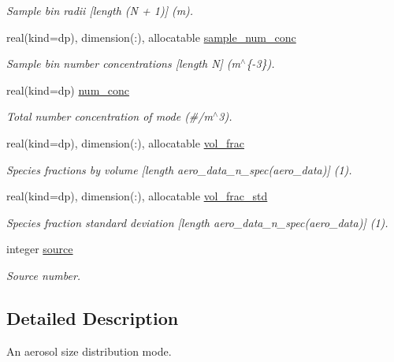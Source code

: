 \begin{DoxyCompactItemize}
\begin{DoxyCompactList}\small\item\em Sample bin radii \mbox{[}length {\ttfamily (N + 1)}\mbox{]} (m). \end{DoxyCompactList}\item 
real(kind=dp), dimension(\+:), allocatable \mbox{\hyperlink{structpmc__aero__mode_1_1aero__mode__t_a1c5ca42a2671596e2e635d1bb9ad6e75}{sample\+\_\+num\+\_\+conc}}
\begin{DoxyCompactList}\small\item\em Sample bin number concentrations \mbox{[}length {\ttfamily N}\mbox{]} (m$^\wedge$\{-\/3\}). \end{DoxyCompactList}\item 
real(kind=dp) \mbox{\hyperlink{structpmc__aero__mode_1_1aero__mode__t_afffe6af2aced02a8f50cddf8e6c3b71b}{num\+\_\+conc}}
\begin{DoxyCompactList}\small\item\em Total number concentration of mode (\#/m$^\wedge$3). \end{DoxyCompactList}\item 
real(kind=dp), dimension(\+:), allocatable \mbox{\hyperlink{structpmc__aero__mode_1_1aero__mode__t_a916fd39b4601c6df6248bf0c6c86391e}{vol\+\_\+frac}}
\begin{DoxyCompactList}\small\item\em Species fractions by volume \mbox{[}length {\ttfamily aero\+\_\+data\+\_\+n\+\_\+spec(aero\+\_\+data)}\mbox{]} (1). \end{DoxyCompactList}\item 
real(kind=dp), dimension(\+:), allocatable \mbox{\hyperlink{structpmc__aero__mode_1_1aero__mode__t_acccfc1b80d36d84c8c437271810e5c76}{vol\+\_\+frac\+\_\+std}}
\begin{DoxyCompactList}\small\item\em Species fraction standard deviation \mbox{[}length {\ttfamily aero\+\_\+data\+\_\+n\+\_\+spec(aero\+\_\+data)}\mbox{]} (1). \end{DoxyCompactList}\item 
integer \mbox{\hyperlink{structpmc__aero__mode_1_1aero__mode__t_a45c2763552f691a96adffa91af895bf6}{source}}
\begin{DoxyCompactList}\small\item\em Source number. \end{DoxyCompactList}\end{DoxyCompactItemize}


\subsection{Detailed Description}
An aerosol size distribution mode. 

